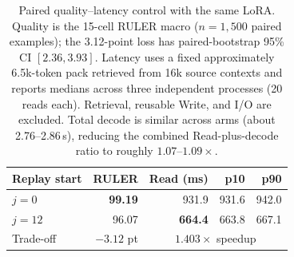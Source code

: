 \begin{table}[!htbp]
\centering
\scriptsize
\setlength{\tabcolsep}{4pt}
\begin{tabular}{@{}lrrrr@{}}
\toprule
\textbf{Replay start} & \textbf{RULER} & \textbf{Read (ms)} & \textbf{p10} & \textbf{p90} \\
\midrule
$j{=}0$  & \textbf{99.19} & 931.9 & 931.6 & 942.0 \\
$j{=}12$ & 96.07 & \textbf{664.4} & 663.8 & 667.1 \\
\midrule
Trade-off & $-3.12$ pt & \multicolumn{3}{c}{$1.403\times$ speedup} \\
\bottomrule
\end{tabular}
\caption{Paired quality--latency control with the same LoRA. Quality is the
15-cell RULER macro ($n{=}1{,}500$ paired examples); the 3.12-point loss has
paired-bootstrap 95\% CI $[2.36,3.93]$. Latency uses a fixed approximately
6.5k-token pack retrieved from 16k source contexts and reports
medians across three independent processes (20 reads each). Retrieval, reusable
Write, and I/O are excluded. Total decode is similar across arms (about
2.76--2.86\,s), reducing the combined Read-plus-decode ratio to roughly
$1.07$--$1.09\times$.}
\label{tab:replay-latency}
\end{table}
